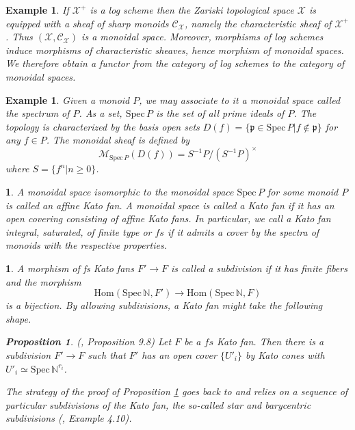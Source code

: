 \documentclass{amsart}%
\numberwithin{equation}{subsection}
\theoremstyle{plain2}
\newtheorem{prop}[equation]{Proposition}
\theoremstyle{definition2}
\newtheorem{example}[equation]{Example}
\theoremstyle{stepstyle}
\theoremstyle{point}
\theoremstyle{subpoint}
\newtheorem{subpoint}[equation]{}%
\newcommand{\spa}[1]{\begin{subpoint}#1\end{subpoint}}           %
\newcommand{\N}{\ensuremath{\mathbb{N}}}
\newcommand{\cX}{\ensuremath{\mathscr{X}}}
\newcommand{\fp}{\ensuremath{\mathfrak{p}}}
\newcommand{\caM}{\ensuremath{\mathcal{M}}}
\newcommand{\caC}{\ensuremath{\mathcal{C}}}
\newcommand{\Spec}{\ensuremath{\mathrm{Spec}\,}}
\newcommand{\Hom}{\mathrm{Hom}}
\begin{document}
\begin{example}
If $\cX^+$ is a log scheme then the Zariski topological space $\cX$ is equipped with a sheaf of sharp monoids $\caC_{\cX}$, namely the characteristic sheaf of $\cX^+$. Thus $(\cX,\caC_{\cX})$ is a monoidal space. Moreover, morphisms of log schemes
induce morphisms of characteristic sheaves, hence morphism of monoidal spaces. We therefore obtain a functor from the category of log schemes to the category of monoidal spaces.
\end{example}

\begin{example}
Given a monoid $P$, we may associate to it a monoidal space called the spectrum of $P$. As a set, $\Spec P$ is the set of all prime ideals of $P$. The topology is characterized by the basis open sets $D(f)= \{ \fp \in \Spec P | f \notin \fp \}$ for any $f \in P$. The monoidal sheaf is defined by $$\caM_{\Spec P} (D(f))= S^{-1}P / (S^{-1}P)^{\times}$$ where $S=\{f^n | n \geqslant 0\}$.
\end{example}

\spa{A monoidal space isomorphic to the monoidal space $\Spec P$ for some monoid $P$ is called an affine Kato fan. A monoidal space is called a Kato fan if it has an open covering consisting of affine Kato fans. In particular, we call a Kato fan integral, saturated, of finite type or $fs$ if it admits a cover by the spectra of monoids with the respective properties.}

\spa{A morphism of fs Kato fans $F' \rightarrow F$ is called a \emph{subdivision} if it has finite fibers and the morphism $$\Hom(\Spec \N, F') \rightarrow \Hom (\Spec \N, F)$$ is a bijection. By allowing subdivisions, a Kato fan might take the following shape.
\begin{prop} \label{kato subdivision}(\cite{Kato1994a}, Proposition 9.8)
Let $F$ be a $fs$ Kato fan. Then there is a subdivision $F' \rightarrow F$ such that $F'$ has an open cover $\{U'_i\}$ by Kato cones with $U'_i \simeq \Spec \N^{r_i}$. 
\end{prop}
The strategy of the proof of Proposition \ref{kato subdivision} goes back to \cite{KempfKnudsenMumfordEtAl1973} and relies on a sequence of particular subdivisions of the Kato fan, the so-called star and barycentric subdivisions (\cite{AbramovichChenMarcusEtAl2015}, Example 4.10).}
\end{document}
